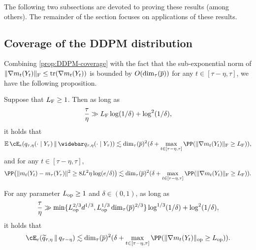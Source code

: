 The following two subsections are devoted to proving these results (among others).
The remainder of the section focuses on applications of these results.


\subsection{Coverage of the DDPM distribution}









Combining \cref{prop:DDPM-coverage} with the fact that the sub-exponential norm of $\lVert\nabla m_t(Y_t)\rVert_{\mathrm{F}}\leq \mathrm{tr}(\nabla m_t(Y_t))$ is bounded by $O(\dim_\tau(\overline{p}))$ for any $t\in[\tau-\eta,\tau]$, we have the following proposition.
\begin{corollary}\label{cor:DDPM-coverage}
Suppose that $L_{\rm F}\geq 1$.
Then as long as 
\begin{align*}
    \frac{\tau}{\eta}\gg L_{\rm F}\log(1/\delta)+\log^2(1/\delta),
\end{align*}
it holds that
\begin{align*}
    \En\Dcov[e]{q_{\tau,\eta}(\cdot\mid Y_\tau)}{\wb{q}_{\tau,\eta}(\cdot\mid Y_\tau)}\leqsim \dim_\tau(\pbar)^2(\delta+\max_{t\in[\tau-\eta,\tau]}\PP\prn*{\nrmF{\nabla m_t(Y_t)}\geq \LF}),
\end{align*}
and for any $t\in[\tau-\eta,\tau]$,
\begin{align*}
    \PP\prn*{ \nrm{m_t(Y_t)-m_\tau(Y_\tau)}^2 \geq 8L^2\eta\log(e/\delta) }
    \leqsim \dim_\tau(\pbar)^2(\delta+\max_{t\in[\tau-\eta,\tau]}\PP\prn*{\nrmF{\nabla m_t(Y_t)}\geq \LF}).
\end{align*}
\end{corollary}





\begin{corollary}\label{cor:coverage-backward}
For any parameter $L_{\rm op}\geq 1$ and $\delta\in(0,1)$, as long as 
\begin{align}\label{eq:coverage-eta}
    \frac{\tau}{\eta}\gg \min\{ L_{\rm op}^{2/3}d^{1/3}, L_{\rm op}^{1/3}\dim_\tau(\overline{p})^{2/3} \} \log^{1/3}(1/\delta)+\log^2(1/\delta),
\end{align}
it holds that
\begin{align*}
    \Dcov[e]{\wt{q}_{\tau,\eta}}{q_{\tau-\eta}}\leqsim \dim_\tau(\pbar)^2(\delta+\max_{t\in[\tau-\eta,\tau]}\PP(\nrmop{\nabla m_t(Y_t)}\geq \Lop)).
\end{align*}
\end{corollary}



